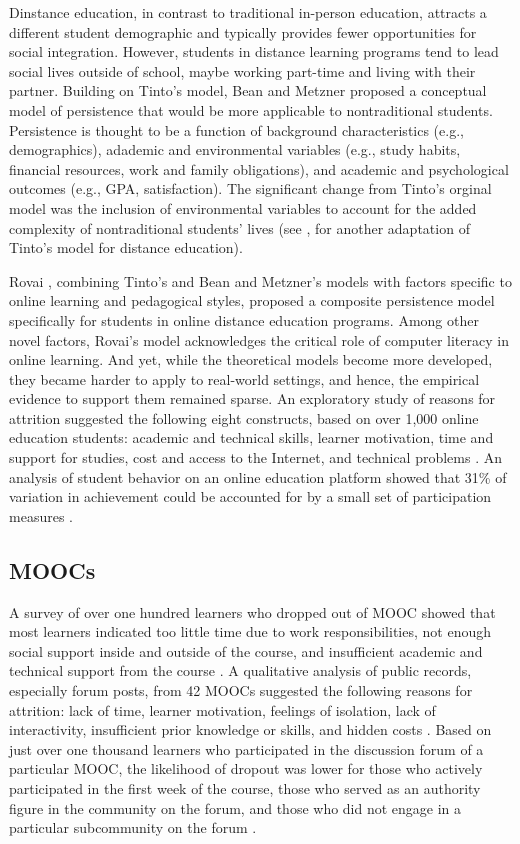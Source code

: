 \documentclass{sigchi}\usepackage[]{graphicx}\usepackage[]{color}
\begin{document}
Dinstance education, in contrast to traditional in-person education, attracts a different student demographic and typically provides fewer opportunities for social integration. However, students in distance learning programs tend to lead social lives outside of school, maybe working part-time and living with their partner. Building on Tinto's model, Bean and Metzner \citeyear{bean1985conceptual} proposed a conceptual model of persistence that would be more applicable to nontraditional students. Persistence is thought to be a function of background characteristics (e.g., demographics), adademic and environmental variables (e.g., study habits, financial resources, work and family obligations), and academic and psychological outcomes (e.g., GPA, satisfaction). The significant change from Tinto's orginal model was the inclusion of environmental variables to account for the added complexity of nontraditional students' lives (see \cite{kember1989longitudinal}, for another adaptation of Tinto's model for distance education).

Rovai \citeyear{rovai2003search}, combining Tinto's and Bean and Metzner's models with factors specific to online learning and pedagogical styles, proposed a composite persistence model specifically for students in online distance education programs. Among other novel factors, Rovai's model acknowledges the critical role of computer literacy in online learning. And yet, while the theoretical models become more developed, they became harder to apply to real-world settings, and hence, the empirical evidence to support them remained sparse. An exploratory study of reasons for attrition suggested the following eight constructs, based on over 1,000 online education students: academic and technical skills, learner motivation, time and support for studies, cost and access to the Internet, and technical problems \cite{muilenburg2005student}. An analysis of student behavior on an online education platform showed that 31\% of variation in achievement could be accounted for by a small set of participation measures \cite{morris2005tracking}.


\subsection{MOOCs}

A survey of over one hundred learners who dropped out of MOOC showed that most learners indicated too little time due to work responsibilities, not enough social support inside and outside of the course, and insufficient academic and technical support from the course \cite{gutl2014attrition}. A qualitative analysis of public records, especially forum posts, from 42 MOOCs suggested the following reasons for attrition: lack of time, learner motivation, feelings of isolation, lack of interactivity, insufficient prior knowledge or skills, and hidden costs \cite{khalil2014moocs}. Based on just over one thousand learners who participated in the discussion forum of a particular MOOC, the likelihood of dropout was lower for those who actively participated in the first week of the course, those who served as an authority figure in the community on the forum, and those who did not engage in a particular subcommunity on the forum \cite{rose2014social}.
\end{document}
